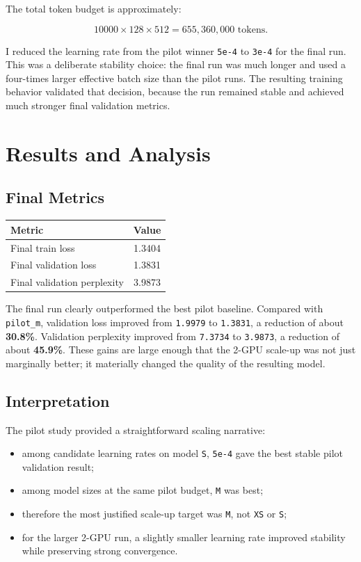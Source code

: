 \documentclass[11pt]{article}
\begin{document}
The total token budget is approximately:

\[
10000 \times 128 \times 512 = 655{,}360{,}000 \text{ tokens.}
\]

I reduced the learning rate from the pilot winner \texttt{5e-4} to \texttt{3e-4} for the final run. This was a deliberate stability choice: the final run was much longer and used a four-times larger effective batch size than the pilot runs. The resulting training behavior validated that decision, because the run remained stable and achieved much stronger final validation metrics.

\section{Results and Analysis}

\subsection{Final Metrics}

\begin{table}[H]
\centering
\begin{tabular}{lc}
\toprule
Metric & Value \\
\midrule
Final train loss & 1.3404 \\
Final validation loss & 1.3831 \\
Final validation perplexity & 3.9873 \\
\bottomrule
\end{tabular}
\end{table}

The final run clearly outperformed the best pilot baseline. Compared with \texttt{pilot\_m}, validation loss improved from \texttt{1.9979} to \texttt{1.3831}, a reduction of about \textbf{30.8\%}. Validation perplexity improved from \texttt{7.3734} to \texttt{3.9873}, a reduction of about \textbf{45.9\%}. These gains are large enough that the 2-GPU scale-up was not just marginally better; it materially changed the quality of the resulting model.

\subsection{Interpretation}

The pilot study provided a straightforward scaling narrative:

\begin{itemize}
  \item among candidate learning rates on model \texttt{S}, \texttt{5e-4} gave the best stable pilot validation result;
  \item among model sizes at the same pilot budget, \texttt{M} was best;
  \item therefore the most justified scale-up target was \texttt{M}, not \texttt{XS} or \texttt{S};
  \item for the larger 2-GPU run, a slightly smaller learning rate improved stability while preserving strong convergence.
\end{itemize}
\end{document}
